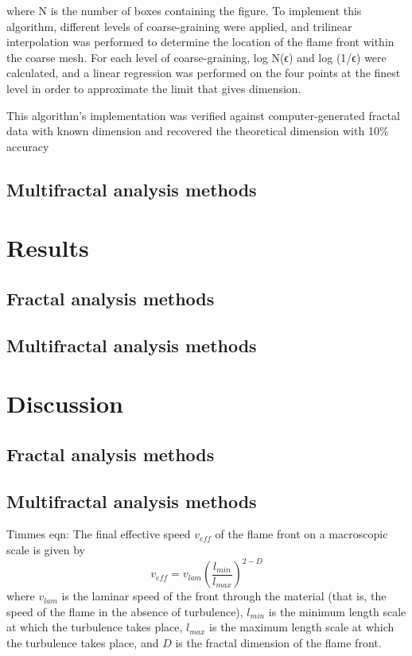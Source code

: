\documentclass[iop]{emulateapj}
\begin{document}
where N is the number of boxes containing the figure.  To implement this algorithm, different levels of coarse-graining were applied, and trilinear interpolation was performed to determine the location of the flame front within the coarse mesh. For each level of coarse-graining, log N(ϵ) and log (1/ϵ) were calculated, and a linear regression was performed on the four points at the finest level in order to approximate the limit that gives dimension.

This algorithm’s implementation was verified against computer-generated fractal data with known dimension and recovered the theoretical dimension with 10\% accuracy

\subsection{Multifractal analysis methods}\label{MultifractalMethods}

\section{Results}\label{Results}

\subsection{Fractal analysis methods}\label{FractalResults}

\subsection{Multifractal analysis methods}\label{MultifractalResults}

\section{Discussion}\label{Discussion}

\subsection{Fractal analysis methods}\label{FractalDiscussion}

\subsection{Multifractal analysis methods}\label{MultifractalDiscussion}


Timmes eqn:
	The final effective speed $v_{eff}$ of the flame front on a macroscopic scale is given by
	\begin{equation} 
	v_{eff} = v_{lam} \left(\frac{l_{min}}{l_{max}}\right)^{2 - D}
	\end{equation}
	where $v_{lam}$ is the laminar speed of the front through the material (that is, the speed of the flame in the absence of turbulence), $l_{min}$ is the minimum length scale at which the turbulence takes place, $l_{max}$ is the maximum length scale at which the turbulence takes place, and $ D $ is the fractal dimension of the flame front.
\end{document}
